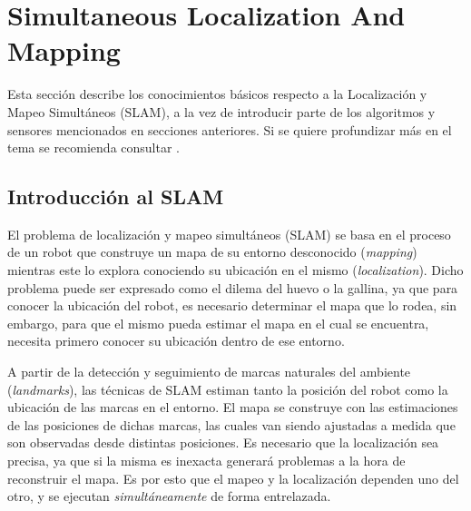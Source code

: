 \section{Simultaneous Localization And Mapping}
\label{sec:slam}
Esta sección describe los conocimientos básicos respecto a la Localización y Mapeo Simultáneos (SLAM), a la vez de introducir parte de los algoritmos y sensores mencionados en secciones anteriores. Si se quiere profundizar más en el tema se recomienda consultar \cite{suenderhauf2012}\cite{reid2016}.

\subsection{Introducción al SLAM}
El problema de localización y mapeo simultáneos (SLAM) se basa en el proceso de un robot que construye un mapa de su entorno desconocido (\textit{mapping}) mientras este lo explora conociendo su ubicación en el mismo (\textit{localization}). Dicho problema puede ser expresado como el dilema del huevo o la gallina, ya que para conocer la ubicación del robot, es necesario determinar el mapa que lo rodea, sin embargo, para que el mismo pueda estimar el mapa en el cual se encuentra, necesita primero conocer su ubicación dentro de ese entorno. 

A partir de la detección y seguimiento de marcas naturales del ambiente (\textit{landmarks}), las técnicas de SLAM  estiman  tanto  la  posición  del  robot  como  la  ubicación  de las marcas en el entorno. El mapa se construye con las estimaciones de las posiciones  de  dichas  marcas,  las  cuales  van  siendo ajustadas  a  medida  que  son observadas desde distintas posiciones. Es necesario que la localización sea precisa, ya que si la misma es inexacta generará problemas a la hora de reconstruir el mapa. Es por esto que el mapeo y la localización dependen uno del otro, y se ejecutan \textit{simultáneamente} de forma entrelazada.

